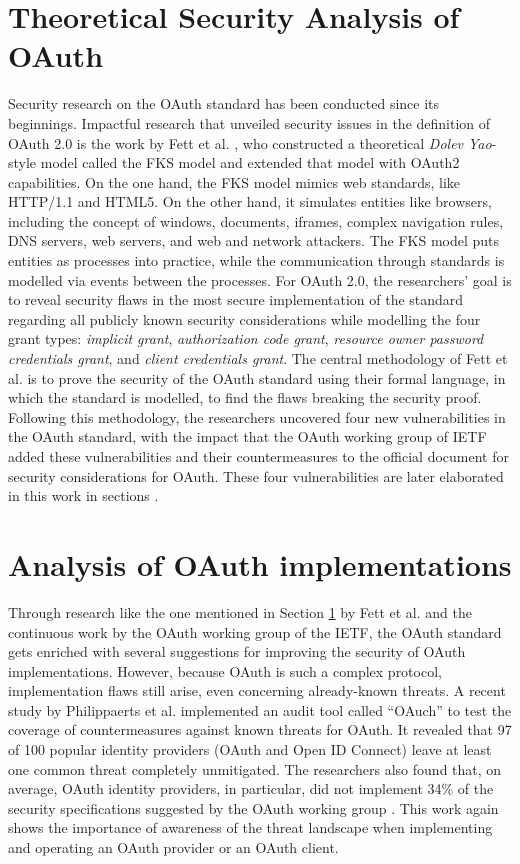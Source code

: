 \documentclass[
    fontsize=12pt,
    headings=small,
    parskip=half,           %
    bibliography=totoc,
    numbers=noenddot,       %
    open=any,               %
    ]{scrreprt}
\begin{document}
\section{Theoretical Security Analysis of OAuth}
\label{sec:fks_model}
Security research on the OAuth standard has been conducted since its beginnings. Impactful research that unveiled security issues in the definition of OAuth 2.0 is the work by Fett et al. \cite{fett2016comprehensive}, who constructed a theoretical \emph{Dolev Yao}-style model called the FKS model and extended that model with OAuth2 capabilities. On the one hand, the FKS model mimics web standards, like HTTP/1.1 and HTML5. On the other hand, it simulates entities like browsers, including the concept of windows, documents, iframes, complex navigation rules, DNS servers, web servers, and web and network attackers. The FKS model puts entities as processes into practice, while the communication through standards is modelled via events between the processes. For OAuth 2.0, the researchers' goal is to reveal security flaws in the most secure implementation of the standard regarding all publicly known security considerations while modelling the four grant types: \emph{implicit grant}, \emph{authorization code grant}, \emph{resource owner password credentials grant}, and \emph{client credentials grant}. The central methodology of Fett et al. is to prove the security of the OAuth standard using their formal language, in which the standard is modelled, to find the flaws breaking the security proof. Following this methodology, the researchers uncovered four new vulnerabilities in the  OAuth standard, with the impact that the OAuth working group of IETF added these vulnerabilities and their countermeasures to the official document for security considerations for OAuth. These four vulnerabilities are later elaborated in this work in sections .

\section{Analysis of OAuth implementations}
Through research like the one mentioned in Section \ref{sec:fks_model} by Fett et al. and the continuous work by the OAuth working group of the IETF, the OAuth standard gets enriched with several suggestions for improving the security of OAuth implementations. However, because OAuth is such a complex protocol, implementation flaws still arise, even concerning already-known threats. A recent study by Philippaerts et al. implemented an audit tool called ``OAuch'' to test the coverage of countermeasures against known threats for OAuth. It revealed that 97 of 100 popular identity providers (OAuth and Open ID Connect) leave at least one common threat completely unmitigated. The researchers also found that, on average, OAuth identity providers, in particular, did not implement 34\% of the security specifications suggested by the OAuth working group \cite{philippaerts2022oauch}. This work again shows the importance of awareness of the threat landscape when implementing and operating an OAuth provider or an OAuth client.
\end{document}
